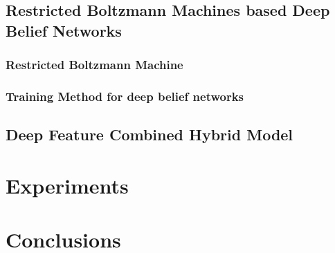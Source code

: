 \documentclass[journal]{IEEEtran}
\begin{document}
\subsection{Restricted Boltzmann Machines based Deep Belief Networks}
\subsubsection{Restricted Boltzmann Machine}

\subsubsection{Training Method for deep belief networks}


\subsection{Deep Feature Combined Hybrid Model}





\section{Experiments}

\section{Conclusions}


%
%
\end{document}
